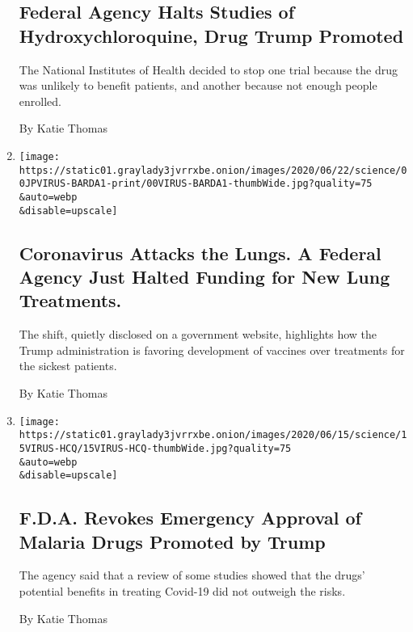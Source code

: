 \begin{enumerate}
  \hypertarget{federal-agency-halts-studies-of-hydroxychloroquine-drug-trump-promoted}{%
  \subsection{Federal Agency Halts Studies of Hydroxychloroquine, Drug
  Trump
  Promoted}\label{federal-agency-halts-studies-of-hydroxychloroquine-drug-trump-promoted}}

  The National Institutes of Health decided to stop one trial because
  the drug was unlikely to benefit patients, and another because not
  enough people enrolled.

  By Katie Thomas
\item
  \href{/2020/06/19/health/coronavirus-lung-treatment-funding.html}{}

  \texttt{[image: https://static01.graylady3jvrrxbe.onion/images/2020/06/22/science/00JPVIRUS-BARDA1-print/00VIRUS-BARDA1-thumbWide.jpg?quality=75\\\&auto=webp\\\&disable=upscale]}

  \hypertarget{coronavirus-attacks-the-lungs-a-federal-agency-just-halted-funding-for-new-lung-treatments}{%
  \subsection{Coronavirus Attacks the Lungs. A Federal Agency Just
  Halted Funding for New Lung
  Treatments.}\label{coronavirus-attacks-the-lungs-a-federal-agency-just-halted-funding-for-new-lung-treatments}}

  The shift, quietly disclosed on a government website, highlights how
  the Trump administration is favoring development of vaccines over
  treatments for the sickest patients.

  By Katie Thomas
\item
  \href{/2020/06/15/health/fda-hydroxychloroquine-malaria.html}{}

  \texttt{[image: https://static01.graylady3jvrrxbe.onion/images/2020/06/15/science/15VIRUS-HCQ/15VIRUS-HCQ-thumbWide.jpg?quality=75\\\&auto=webp\\\&disable=upscale]}

  \hypertarget{fda-revokes-emergency-approval-of-malaria-drugs-promoted-by-trump}{%
  \subsection{F.D.A. Revokes Emergency Approval of Malaria Drugs
  Promoted by
  Trump}\label{fda-revokes-emergency-approval-of-malaria-drugs-promoted-by-trump}}

  The agency said that a review of some studies showed that the drugs'
  potential benefits in treating Covid-19 did not outweigh the risks.

  By Katie Thomas
\end{enumerate}

